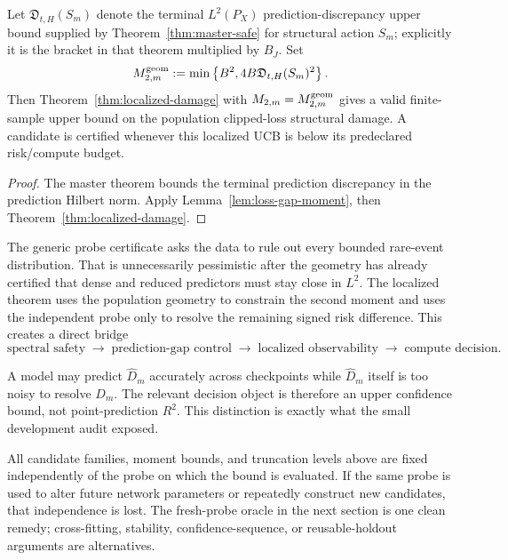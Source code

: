 \begin{corollary}\label{cor:geometry-localized}
Let $\mathfrak D_{t,H}(S_m)$ denote the terminal $L^2(P_X)$ prediction-discrepancy upper bound supplied by Theorem~\ref{thm:master-safe} for structural action $S_m$; explicitly it is the bracket in that theorem multiplied by $B_J$. Set
\[
M_{2,m}^{\rm geom}
:=
\min\left\{B^2,4B\mathfrak D_{t,H}(S_m)^2\right\}.
\]
Then Theorem~\ref{thm:localized-damage} with $M_{2,m}=M_{2,m}^{\rm geom}$ gives a valid finite-sample upper bound on the population clipped-loss structural damage. A candidate is certified whenever this localized UCB is below its predeclared risk/compute budget.
\end{corollary}

\begin{proof}
The master theorem bounds the terminal prediction discrepancy in the prediction Hilbert norm. Apply Lemma~\ref{lem:loss-gap-moment}, then Theorem~\ref{thm:localized-damage}.
\end{proof}

\begin{remark}
The generic probe certificate asks the data to rule out every bounded rare-event distribution. That is unnecessarily pessimistic after the geometry has already certified that dense and reduced predictors must stay close in $L^2$. The localized theorem uses the population geometry to constrain the second moment and uses the independent probe only to resolve the remaining signed risk difference. This creates a direct bridge
\[
\boxed{
\text{spectral safety}
\;\longrightarrow\;
\text{prediction-gap control}
\;\longrightarrow\;
\text{localized observability}
\;\longrightarrow\;
\text{compute decision}.}
\]
\end{remark}

\begin{remark}
A model may predict $\widehat D_m$ accurately across checkpoints while $\widehat D_m$ itself is too noisy to resolve $D_m$. The relevant decision object is therefore an upper confidence bound, not point-prediction $R^2$. This distinction is exactly what the small development audit exposed.
\end{remark}

\begin{remark}
All candidate families, moment bounds, and truncation levels above are fixed independently of the probe on which the bound is evaluated. If the same probe is used to alter future network parameters or repeatedly construct new candidates, that independence is lost. The fresh-probe oracle in the next section is one clean remedy; cross-fitting, stability, confidence-sequence, or reusable-holdout arguments are alternatives.
\end{remark}
